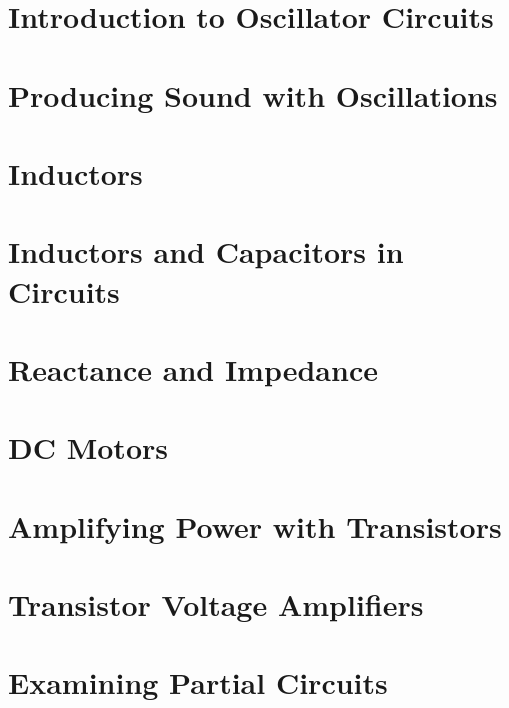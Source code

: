 \documentclass[twocolumn]{book}
\begin{document}


\chapter{Introduction to Oscillator Circuits}



\chapter{Producing Sound with Oscillations}



\chapter{Inductors}



\chapter{Inductors and Capacitors in Circuits}



\chapter{Reactance and Impedance}



\chapter{DC Motors}



\chapter{Amplifying Power with Transistors}



\chapter{Transistor Voltage Amplifiers}



\chapter{Examining Partial Circuits}


\end{document}
